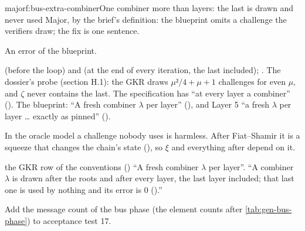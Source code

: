 \begin{finding}{major}{f:bus-extra-combiner}{One combiner more than layers: the last is drawn and never used}
 Major, by the brief's definition: the blueprint omits a challenge the verifiers
draw; the fix is one sentence.

 An error of the blueprint.

  (before the loop) and  (at the end of
every iteration, the last included); . The dossier's probe (section H.1): the
GKR draws $μ²/4 + μ + 1$ challenges for even $μ$, and $ζ$ never contains the last. The
specification has ``at every layer a combiner'' (). The blueprint: ``A fresh combiner
$λ$ per layer'' (), and Layer 5 ``a fresh $λ$ per layer … exactly as pinned''
().

In the oracle model a challenge nobody uses is harmless. After Fiat--Shamir it is a squeeze that
changes the chain's state (), so $ξ$ and everything after depend on it.

\begin{change}{the GKR row of the conventions ()}
\asis ``A fresh combiner $λ$ per layer''.
\asproposed ``A combiner $λ$ is drawn after the roots and after every layer, the last layer
included; that last one is used by nothing and its error is $0$ ().''
\end{change}
Add the message count of the bus phase (the element counts after \cref{tab:gen-bus-phase}) to
acceptance test 17.
\end{finding}

